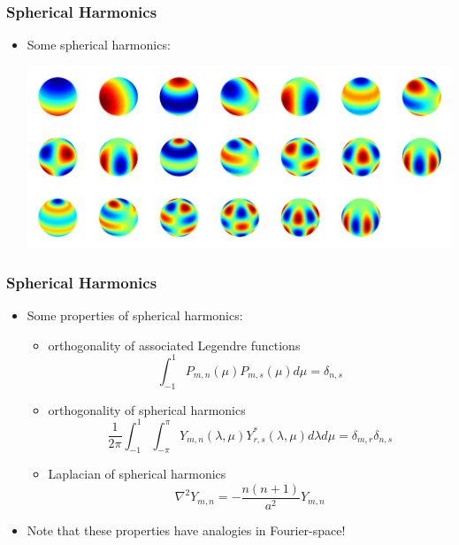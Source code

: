 \documentclass[aspectratio=43,9pt]{beamer}
\begin{document}
%
%
\begin{frame}
	\frametitle{Spherical Harmonics}
	\vfill\begin{itemize}
		\item Some spherical harmonics:
			\begin{center}
				\hspace*{-1cm}\includegraphics[width=.95\textwidth]{SH.jpg}\hspace*{-1cm}
			\end{center}
	\end{itemize}\vfill
\end{frame}
%
%
\begin{frame}
	\frametitle{Spherical Harmonics}
	\vfill\begin{itemize}
		\item Some properties of spherical harmonics:\vfill
			\begin{itemize}
				\item orthogonality of associated Legendre functions
					\begin{equation*}
						\int_{-1}^1 P_{m,n} (\mu ) P_{m,s} (\mu) d \mu =\delta_{n,s}
					\end{equation*}
				\item orthogonality of spherical harmonics
					\begin{equation*}
						\frac{1}{2\pi}\int_{-1}^1 \int_{-\pi}^\pi Y_{m,n} (\lambda, \mu ) Y^*_{r,s} (\lambda, \mu) d \lambda d \mu = \delta_{m,r} \delta_{n,s}
					\end{equation*}
				\item Laplacian of spherical harmonics
					\begin{equation*}
						\nabla^2 Y_{m,n} = - \frac{n (n+1)}{a^2} Y_{m,n}
					\end{equation*}
			\end{itemize}\vfill
		\item Note that these properties have analogies in Fourier-space!
	\end{itemize}\vfill
\end{frame}
\end{document}
